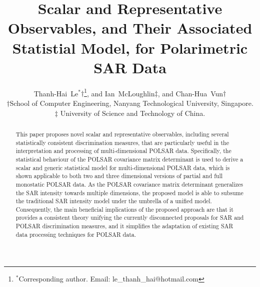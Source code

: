 \documentclass[printer]{tRSL2e}
\title{
  Scalar and Representative Observables, and Their Associated Statistial Model, for Polarimetric SAR Data
}
\begin{document}
\author{
  Thanh-Hai~Le$^{\ast}$$\dag$\thanks{$^\ast$Corresponding
author. Email: le\_thanh\_hai@hotmail.com \vspace{6pt}},
  and Ian~McLoughlin${\ddag}$, 
  and Chan-Hua~Vun${\dag}$\\
\vspace{6pt} $\dag$School of Computer Engineering, Nanyang Technological University, Singapore.\\
$\ddag$ University of Science and Technology of China.\\
\vspace{6pt} }

\maketitle

\begin{abstract}
This paper proposes novel scalar and representative observables,
  including several statistically consistent discrimination measures,
  that are particularly useful in the interpretation and processing of multi-dimensional POLSAR data.
Specifically, the statistical behaviour of the POLSAR covariance matrix determinant is used
  to derive a scalar and generic statistical model for multi-dimensional POLSAR data,
  which is shown applicable to both two and three dimensional versions of partial and full monostatic POLSAR data.
As the POLSAR covariance matrix determinant generalizes the SAR intensity towards multiple dimensions,
  the proposed model is able to subsume the traditional SAR intensity model under the umbrella of a unified model. 
Consequently, the main beneficial implications of the proposed approach are that
  it provides a consistent theory unifying the currently disconnected proposals for SAR and POLSAR discrimination measures,
  and it simplifies the adaptation of existing SAR data processing techniques for POLSAR data.
\end{abstract}
\end{document}
